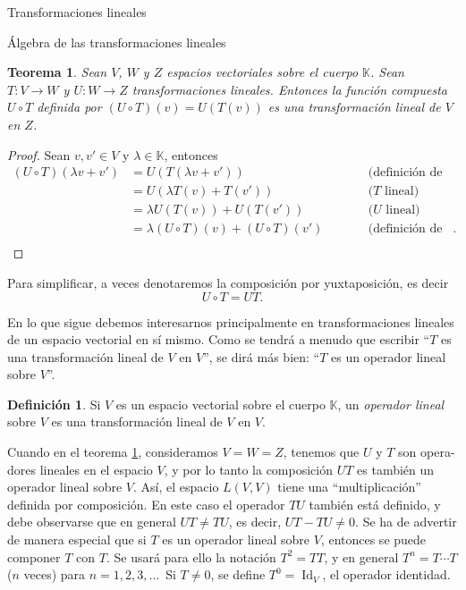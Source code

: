 \documentclass[a4paper,12pt,twoside,spanish,reqno]{amsbook}
\newtheorem{teorema}{Teorema}[section]
\theoremstyle{definition}
\newtheorem{definicion}{Definici\'on}[section]
\theoremstyle{remark}
\newcommand{\Id}{\operatorname{Id}}
\newcommand{\K}{\mathbb K}
\begin{document}
\begin{chapter}{Transformaciones lineales}
\begin{section}{Álgebra de las transformaciones lineales}
		\begin{teorema}\label{th-6-hoffman}
			Sean $V$, $W$ y $Z$ espacios vectoriales sobre el cuerpo $\K$.  Sean $T: V \to W$ y $U: W \to Z$ 
			transformaciones lineales. Entonces la función compuesta $U\circ T$ definida por $(U\circ T)(v) = U(T(v))$ es una transformación lineal de $V$ en $Z$.
		\end{teorema} 
		\begin{proof} Sean $v, v' \in V$ y $\lambda \in \K$, entonces
			\begin{equation*}
			\begin{array}{rlll}
				(U\circ T)(\lambda v + v') &= U(T(\lambda v + v'))&\qquad&\text{(definición de composición)} \\
				 &= U(\lambda T( v) + T(v'))&\qquad&\text{($T$ lineal)} \\
				 &= \lambda U(T( v)) + U(T(v'))&\qquad&\text{($U$ lineal)} \\
				 &= \lambda (U\circ T)( v) + (U\circ T)(v')&\qquad&\text{(definición de composición)}. \\
			\end{array}
			\end{equation*}
			
		\end{proof}
		
		Para simplificar, a veces  denotaremos la composición por yuxtaposición,  es decir $$U\circ T = U T.$$
		
		
		En lo que sigue debemos interesarnos principalmente en transformaciones lineales de un espacio vectorial en sí mismo. Como se tendrá a menudo que 	escribir ``$T$ es una transformación lineal de $V$ en $V$'', se dirá más bien: ``$T$ es un operador lineal sobre $V$''. 
		
		\begin{definicion}
			Si $V$ es un espacio vectorial sobre el cuerpo $\K$, un \textit{operador lineal} sobre $V$ es una transformación lineal de $V$ en $V$.
		\end{definicion}
		
		Cuando  en el teorema \ref{th-6-hoffman}, consideramos $V = W = Z$, tenemos que $U$ y $T$ son opera-
		dores lineales en el espacio $V$, y por lo tanto la composición $UT$ es también un operador lineal sobre $V$. Así, el espacio $L(V, V)$ tiene una ``multiplicación'' definida por composición. En este caso el operador $TU$ también está definido, y debe observarse que en general $UT \not= TU$, es decir, $UT - TU \not= 0$. Se ha de advertir de manera especial que si $T$ es un operador lineal sobre $V$, entonces se puede componer $T$ con $T$. Se usará para ello la notación $T^2 = TT$, y en general $T^n = T \cdots T$ ($n$ veces) para $n = 1, 2, 3, \ldots$\,  Si $T \ne 0$, se define $T^0 = \Id_V$, el operador identidad.
			

\end{section}
\end{chapter}
\end{document}
